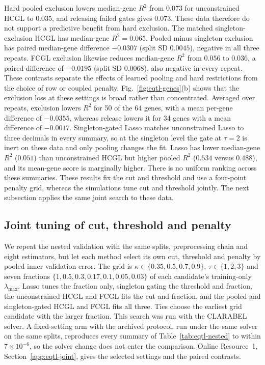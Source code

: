 \documentclass[lineno,pdflatex,sn-basic]{sn-jnl}
\theoremstyle{thmstyleone}
\begin{document}
Hard pooled exclusion lowers median-gene $R^2$ from $0.073$ for
unconstrained HCGL to $0.035$, and releasing failed gates gives $0.073$.
These data therefore do not support a predictive benefit from hard exclusion.
The matched singleton-exclusion HCGL has median-gene $R^2=0.065$.
Pooled minus singleton exclusion has paired median-gene difference $-0.0307$
(split SD $0.0045$), negative in all three repeats. FCGL exclusion likewise
reduces median-gene $R^2$ from $0.056$ to $0.036$, a paired difference of
$-0.0195$ (split SD $0.0068$), also negative in every repeat. These contrasts
separate the effects of learned pooling and hard restrictions from the choice
of row or coupled penalty.
Fig.~\ref{fig:eqtl-genes}(b) shows that the exclusion loss at these settings
is broad rather than concentrated. Averaged over repeats, exclusion lowers
$R^2$ for 50 of the 64 genes, with a mean per-gene difference of $-0.0355$,
whereas release lowers it for 34 genes with a mean difference of $-0.0017$.
Singleton-gated
Lasso matches unconstrained Lasso to three decimals in every summary, so at the
singleton level the gate at $\tau=2$ is inert on these data and only pooling
changes the fit.
Lasso has lower median-gene $R^2$ ($0.051$) than unconstrained HCGL but higher
pooled $R^2$ ($0.534$ versus $0.488$), and its mean-gene score is marginally
higher. There is no uniform ranking across these summaries. These results
fix the cut and threshold and use a four-point penalty grid, whereas the
simulations tune cut and threshold jointly. The next subsection applies the
same joint search to these data.

\subsection{Joint tuning of cut, threshold and penalty}\label{sec:eqtl-joint}

We repeat the nested validation with the same splits, preprocessing chain and
eight estimators, but let each method select its own cut, threshold and
penalty by pooled inner validation error. The grid is
$\kappa\in\{0.35,0.5,0.7,0.9\}$, $\tau\in\{1,2,3\}$ and seven fractions
$\{1,0.5,0.3,0.17,0.1,0.05,0.03\}$ of each candidate's training-only
$\lambda_{\max}$. Lasso tunes the fraction only, singleton gating the threshold
and fraction, the unconstrained HCGL and FCGL fits the cut and fraction, and
the pooled and singleton-gated HCGL and FCGL fits all three. Ties choose the
earliest grid candidate with the larger fraction. This search was run with
the CLARABEL solver. A fixed-setting arm with the archived protocol, run
under the same solver on the same splits, reproduces every summary of
Table~\ref{tab:eqtl-nested} to within $7\times10^{-6}$, so the solver change
does not enter the comparison. Online Resource~1,
Section~\ref{app:eqtl-joint}, gives the selected settings and the paired
contrasts.
\end{document}

